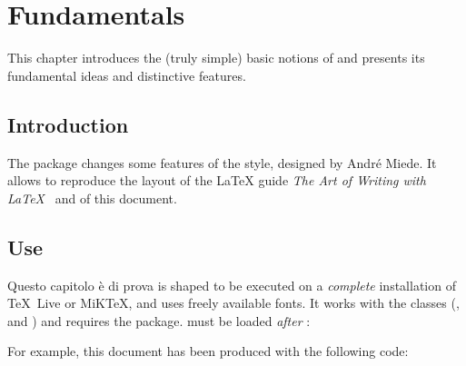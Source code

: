 
\chapter{Fundamentals}
\label{chp:fundamentals}

This chapter introduces the (truly simple) basic notions of \arsclassica{} and presents its fundamental ideas and distinctive features.



\section{Introduction}

The \arsclassica{} package changes some features of the \classicthesis{} style, designed by Andr\'e Miede. It allows to reproduce the layout of the \LaTeX{} guide \emph{The Art of Writing with \LaTeX}~\parencite{pantieri:arte} and of this document.

\section{Use}

Questo capitolo è di prova is shaped to be executed on a \emph{complete} installation of \TeX{}~Live or MiK\TeX, and uses freely available fonts.
It works with the  classes (,  and ) and requires the  package. \arsclassica{} must be loaded \emph{after} :

For example, this document has been produced with the following code:

